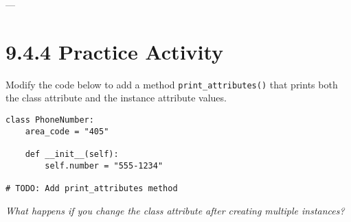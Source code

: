 ---

\section{9.4.4 Practice Activity}

Modify the code below to add a method \texttt{print\_attributes()} 
that prints both the class attribute and the instance attribute values.

\begin{verbatim}
class PhoneNumber:
    area_code = "405"

    def __init__(self):
        self.number = "555-1234"

# TODO: Add print_attributes method
\end{verbatim}

\begin{center}
\textit{What happens if you change the class attribute after creating multiple instances?}
\end{center}


